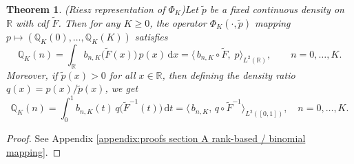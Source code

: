\documentclass{article}
\newtheorem{theorem}{Theorem}[section]
\begin{document}
\begin{theorem}(Riesz representation of $\Phi_{K}$)\label{theorem:Riesz Representation}
Let \(\tilde p\) be a fixed continuous density on \(\mathbb{R}\) with cdf \(\tilde F\).  Then for any \(K\ge0\), the operator
\(\Phi_K(\cdot, \tilde p)\) mapping \(p\mapsto(\mathbb{Q}_K(0),\dots,\mathbb{Q}_K(K))\) satisfies
\[
\mathbb{Q}_K(n)
=\int_{\mathbb{R}}b_{n,K}\bigl(\tilde F(x)\bigr)\,p(x)\,\mathrm{d}x
=\bigl\langle\,b_{n,K}\circ\tilde F,\;p\bigr\rangle_{L^2(\mathbb{R})},
\qquad n=0,\dots,K.
\]
Moreover, if $\tilde p(x)>0$ for all $x\in\mathbb{R}$, then defining the density ratio \(q(x)=p(x)/\tilde p(x)\), we get
\[
\mathbb{Q}_K(n)
=\int_{0}^{1} b_{n,K}(t)\,q\bigl(\tilde F^{-1}(t)\bigr)\,\mathrm{d}t
=\bigl\langle\,b_{n,K},\,q\circ\tilde F^{-1}\bigr\rangle_{L^2([0,1])}, \quad n=0,\ldots,K.
\]
\end{theorem}
\begin{proof}
    See Appendix \ref{appendix:proofs section A rank-based / binomial mapping}.
\end{proof}

\end{document}

